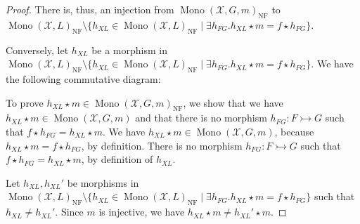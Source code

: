 \begin{proof}
    There is, thus, an injection from $\operatorname{Mono}(\mathcal{X},G,m)_{\operatorname{NF}}$ to $\operatorname{Mono}(\mathcal{X},L)_{\operatorname{NF}} \setminus \{
                h_{XL} \in \operatorname{Mono}(\mathcal{X},L)_{\operatorname{NF}} \mid 
                \exists h_{FG}. h_{XL} \star m = f \star h_{FG}
            \}$.

    Conversely, let $h_{XL}$ be a morphism in $\operatorname{Mono}(\mathcal{X},L)_{\operatorname{NF}}\setminus \{
                h_{XL} \in \operatorname{Mono}(\mathcal{X},L)_{\operatorname{NF}} \mid 
                \exists h_{FG}. h_{XL} \star m = f \star h_{FG}
            \}$. 
    We have the following commutative diagram:
    
    \begin{center}
    \end{center}
    To prove $h_{XL} \star m \in \operatorname{Mono}(\mathcal{X},G,m)_{\operatorname{NF}}$, we show that we have $h_{XL} \star m \in \operatorname{Mono}(\mathcal{X},G,m)$ and that there is no morphism $h_{FG}: F \rightarrowtail G$ such that $f \star h_{FG} = h_{XL} \star m$. We have $h_{XL} \star m \in \operatorname{Mono}(\mathcal{X},G,m)$, because $h_{XL} \star m = f \star h_{FG}$, by definition. There is no morphism $h_{FG}: F \rightarrowtail G$ such that $f \star h_{FG} = h_{XL} \star m$, by definition of $h_{XL}$.

    Let $h_{XL}, h_{XL}'$ be morphisms in $\operatorname{Mono}(\mathcal{X},L)_{\operatorname{NF}}\setminus \{
                h_{XL} \in \operatorname{Mono}(\mathcal{X},L)_{\operatorname{NF}} \mid 
                \exists h_{FG}. h_{XL} \star m = f \star h_{FG}
            \}$ such that $h_{XL} \neq h_{XL}'$.
    Since $m$ is injective, we have $h_{XL} \star m \neq h_{XL}' \star m$. 


\end{proof}
